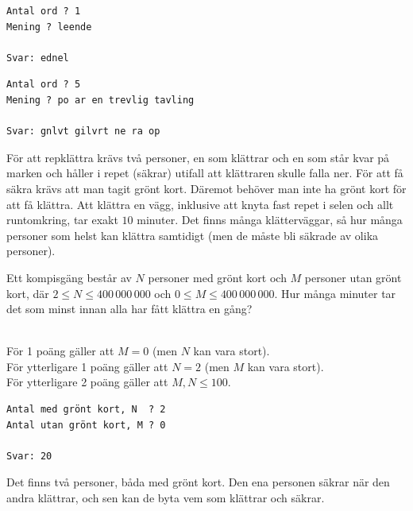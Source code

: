\vspace{1cm}

\begin{verbatim}
Antal ord ? 1
Mening ? leende

Svar: ednel
\end{verbatim}

\vspace{1cm}

\begin{verbatim}
Antal ord ? 5
Mening ? po ar en trevlig tavling

Svar: gnlvt gilvrt ne ra op
\end{verbatim}







\newpage
{}

För att repklättra krävs två personer, en som klättrar och en som står kvar på marken och håller i repet (säkrar) utifall att klättraren skulle falla ner.
För att få säkra krävs att man tagit grönt kort.
Däremot behöver man inte ha grönt kort för att få klättra.
Att klättra en vägg, inklusive att knyta fast repet i selen och allt runtomkring, tar exakt $10$ minuter.
Det finns många klätterväggar, så hur många personer som helst kan klättra samtidigt (men de måste bli säkrade av olika personer).

Ett kompisgäng består av $N$ personer med grönt kort och $M$ personer utan grönt kort, där $2 \le N \le 400\,000\,000$ och $0 \le M \le 400\,000\,000$. Hur många minuter tar det som minst innan alla har fått klättra en gång?

\\
För 1 poäng gäller att $M = 0$ (men $N$ kan vara stort).\\
För ytterligare 1 poäng gäller att $N = 2$ (men $M$ kan vara stort).\\
För ytterligare 2 poäng gäller att $M,N \le 100$.


\vspace{0.5cm}

\begin{verbatim}
Antal med grönt kort, N  ? 2
Antal utan grönt kort, M ? 0

Svar: 20
\end{verbatim}

 Det finns två personer, båda med grönt kort.
Den ena personen säkrar när den andra klättrar, och sen kan de byta vem som klättrar och säkrar. 

